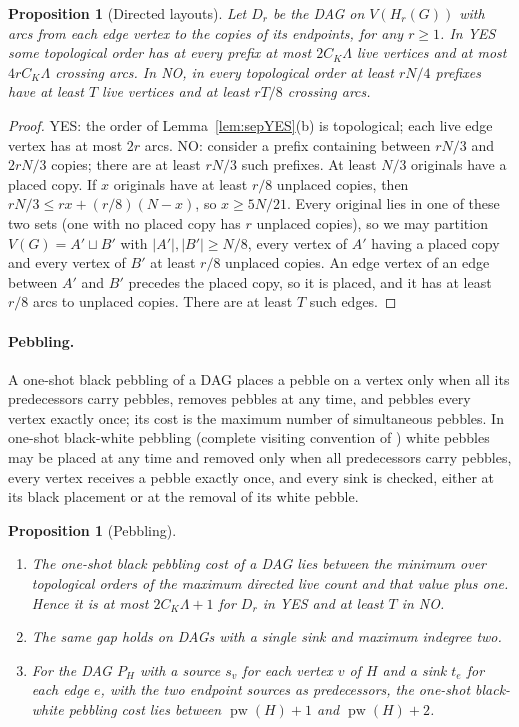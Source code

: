 \documentclass[11pt,letterpaper]{article}
\newtheorem{proposition}[theorem]{Proposition}
\theoremstyle{definition}
\theoremstyle{remark}
\DeclareMathOperator{\pw}{pw}
\begin{document}
\begin{proposition}[Directed layouts]\label{prop:directed}
Let \(D_r\) be the DAG on \(V(H_r(G))\) with arcs from each edge vertex to
the copies of its endpoints, for any \(r\ge1\). In YES some topological order
has at every prefix at most \(2C_K\Lambda\) live vertices and at most
\(4rC_K\Lambda\) crossing arcs. In NO, in every topological order at least
\(rN/4\) prefixes have at least \(T\) live vertices and at least \(rT/8\)
crossing arcs.
\end{proposition}

\begin{proof}
YES: the order of Lemma~\ref{lem:sepYES}(b) is topological; each live edge
vertex has at most \(2r\) arcs. NO: consider a prefix containing between
\(rN/3\) and \(2rN/3\) copies; there are at least \(rN/3\) such prefixes. At
least \(N/3\) originals have a placed copy. If \(x\) originals have at least
\(r/8\) unplaced copies, then \(rN/3\le rx+(r/8)(N-x)\), so \(x\ge5N/21\).
Every original lies in one of these two sets (one with no placed copy has
\(r\) unplaced copies), so we may partition \(V(G)=A'\sqcup B'\) with
\(|A'|,|B'|\ge N/8\), every vertex of \(A'\) having a placed copy and every
vertex of \(B'\) at least \(r/8\) unplaced copies. An edge vertex of an edge
between \(A'\) and \(B'\) precedes the placed copy, so it is placed, and it
has at least \(r/8\) arcs to unplaced copies. There are at least \(T\) such
edges.
\end{proof}

\paragraph{Pebbling.}
A one-shot black pebbling of a DAG places a pebble on a vertex only when all
its predecessors carry pebbles, removes pebbles at any time, and pebbles
every vertex exactly once; its cost is the maximum number of simultaneous
pebbles. In one-shot black-white pebbling (complete visiting convention of
\cite{wapl14}) white pebbles may be placed at any time and removed only when
all predecessors carry pebbles, every vertex receives a pebble exactly once,
and every sink is checked, either at its black placement or at the removal
of its white pebble.

\begin{proposition}[Pebbling]\label{prop:pebble}
\begin{enumerate}[label=\textup{(\alph*)}]
\item The one-shot black pebbling cost of a DAG lies between the minimum
over topological orders of the maximum directed live count and that value
plus one. Hence it is at most \(2C_K\Lambda+1\) for \(D_r\) in YES and at
least \(T\) in NO.
\item The same gap holds on DAGs with a single sink and maximum indegree two.
\item For the DAG \(P_H\) with a source \(s_v\) for each vertex \(v\) of \(H\)
and a sink \(t_e\) for each edge \(e\), with the two endpoint sources as
predecessors, the one-shot black-white pebbling cost lies between
\(\pw(H)+1\) and \(\pw(H)+2\).
\end{enumerate}
\end{proposition}
\end{document}
